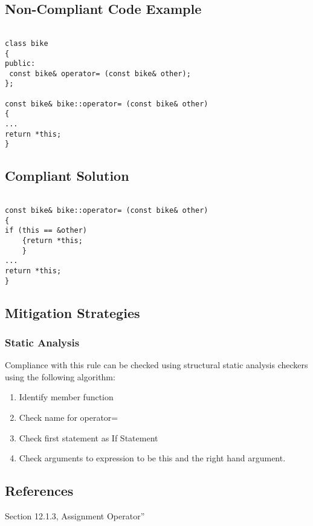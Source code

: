 

\subsection{Non-Compliant Code Example}

\begin{verbatim}

class bike
{
public:
 const bike& operator= (const bike& other);
};

const bike& bike::operator= (const bike& other)
{
...
return *this;
}

\end{verbatim}

\subsection{Compliant Solution}

\begin{verbatim}

const bike& bike::operator= (const bike& other)
{
if (this == &other)
    {return *this;
    }
...
return *this;
}

\end{verbatim}

\subsection{Mitigation Strategies}
\subsubsection{Static Analysis} 

Compliance with this rule can be checked using structural static analysis checkers using the following algorithm:

\begin{enumerate}
\item Identify member function
\item Check name for operator=
\item Check first statement as If Statement
\item Check arguments to expression to be this and the right hand argument.
\end{enumerate}

\subsection{References}

 Section 12.1.3, Assignment Operator''

